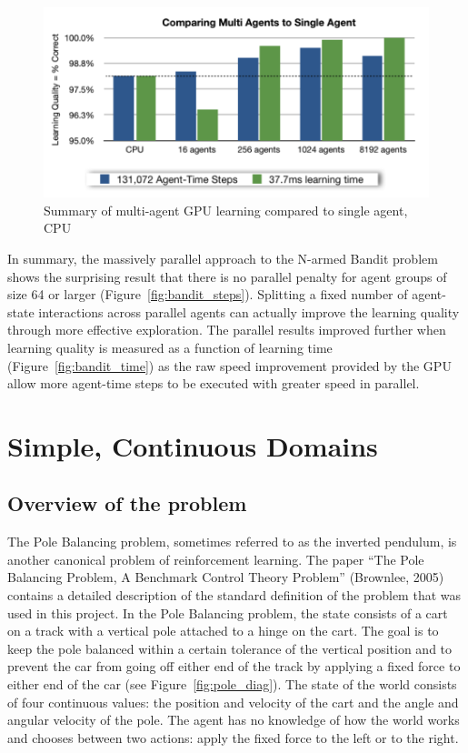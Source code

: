 \documentclass[11pt]{article} %
\begin{document}
\begin{figure}[hbtp]
\center
\includegraphics[scale=0.5]{fig05}
\caption{Summary of multi-agent GPU learning compared to single agent, CPU}
\label{fig:bandit_summary}
\end{figure}

\begin{flushleft}

In summary, the massively parallel approach to the N-armed Bandit problem shows the surprising result that there is no parallel penalty for agent groups of size 64 or larger (Figure~\ref{fig:bandit_steps}).  Splitting a fixed number of agent-state interactions across parallel agents can actually improve the learning quality through more effective exploration.  The parallel results improved further when learning quality is measured as a function of learning time (Figure~\ref{fig:bandit_time}) as the raw speed improvement provided by the GPU allow more agent-time steps to be executed with greater speed in parallel.



\section{Simple, Continuous Domains}
\subsection{Overview of the problem}
The Pole Balancing problem, sometimes referred to as the inverted pendulum, is another canonical problem of reinforcement learning.  The paper “The Pole Balancing Problem, A Benchmark Control Theory Problem” (Brownlee, 2005) contains a detailed description of the standard definition of the problem that was used in this project.  In the Pole Balancing problem, the state consists of a cart on a track with a vertical pole attached to a hinge on the cart.  The goal is to keep the pole balanced within a certain tolerance of the vertical position and to prevent the car from going off either end of the track by applying a fixed force to either end of the car (see Figure~\ref{fig:pole_diag}).  The state of the world consists of four continuous values: the position and velocity of the cart and the angle and angular velocity of the pole.  The agent has no knowledge of how the world works and chooses between two actions: apply the fixed force to the left or to the right.

\end{flushleft}
\end{document}
